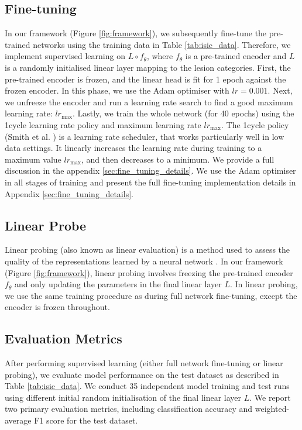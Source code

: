 \documentclass[a4paper,fleqn]{cas-dc}
\begin{document}
\subsection{Fine-tuning}
\label{sec:fine_tuning}

In our framework (Figure \ref{fig:framework}), we subsequently fine-tune the  pre-trained networks  using the training data in Table \ref{tab:isic_data}. Therefore, we implement supervised learning on $L \circ f_\theta$, where $f_\theta$ is a pre-trained encoder and $L $ is a randomly initialised linear layer mapping to the lesion categories. First, the pre-trained encoder is frozen, and the linear head is fit for 1 epoch against the frozen encoder. In this phase, we use the Adam optimiser \cite{kingma2014adam} with $lr=0.001$.  Next, we unfreeze the encoder and run a learning rate search to find a good maximum learning rate: $lr_{\text{max}}$. Lastly, we train the whole network (for 40 epochs) using the 1cycle learning rate policy and  maximum learning rate  $lr_{\text{max}}$. The 1cycle policy (Smith et al. \cite{smith2017super, smith2018disciplined}) is a learning rate scheduler, that works particularly well in low data settings. It  linearly increases the learning rate during training to a maximum value $lr_\text{max}$, and then decreases to a minimum. We provide a full discussion in the appendix \ref{sec:fine_tuning_details}. We use the Adam optimiser in all stages of training and present the full fine-tuning implementation details in Appendix \ref{sec:fine_tuning_details}.

\subsection{Linear Probe}

Linear probing (also known as linear evaluation) is a method used to assess the quality of the  representations learned by a neural network \cite{misra2019self}. In our framework (Figure \ref{fig:framework}), linear probing involves freezing the pre-trained encoder $f_\theta$ and only updating the parameters in the final linear layer $L$. In linear probing,  we use the same training procedure as during full network fine-tuning, except the encoder is frozen throughout. 

\subsection{Evaluation Metrics}

After performing supervised learning (either full network fine-tuning or linear probing), we evaluate model performance on the test dataset as described in Table \ref{tab:isic_data}. We conduct 35  independent model training and test runs using different initial random initialisation of the final linear layer $L$. We report two primary evaluation metrics, including classification accuracy and weighted-average F1 score for the test dataset.
\end{document}
